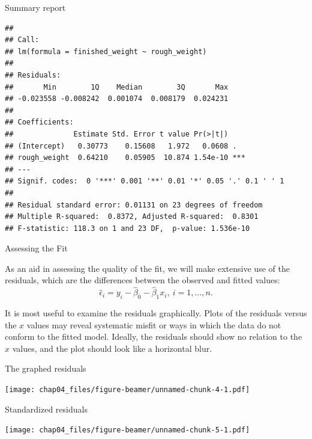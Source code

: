 \documentclass[ignorenonframetext,]{beamer}
\begin{document}
\begin{frame}[fragile]{Summary report}
\protect\hypertarget{summary-report}{}

\begin{verbatim}
## 
## Call:
## lm(formula = finished_weight ~ rough_weight)
## 
## Residuals:
##       Min        1Q    Median        3Q       Max 
## -0.023558 -0.008242  0.001074  0.008179  0.024231 
## 
## Coefficients:
##              Estimate Std. Error t value Pr(>|t|)    
## (Intercept)   0.30773    0.15608   1.972   0.0608 .  
## rough_weight  0.64210    0.05905  10.874 1.54e-10 ***
## ---
## Signif. codes:  0 '***' 0.001 '**' 0.01 '*' 0.05 '.' 0.1 ' ' 1
## 
## Residual standard error: 0.01131 on 23 degrees of freedom
## Multiple R-squared:  0.8372, Adjusted R-squared:  0.8301 
## F-statistic: 118.3 on 1 and 23 DF,  p-value: 1.536e-10
\end{verbatim}

\end{frame}

\begin{frame}{Assessing the Fit}
\protect\hypertarget{assessing-the-fit}{}

As an aid in assessing the quality of the fit, we will make extensive
use of the residuals, which are the differences between the observed and
fitted values:
\[\hat \epsilon_i = y_i-\hat\beta_0-\hat\beta_1x_i,\ i=1,\dots,n.\]

It is most useful to examine the residuals graphically. Plots of the
residuals versus the \(x\) values may reveal systematic misfit or ways
in which the data do not conform to the fitted model. Ideally, the
residuals should show no relation to the \(x\) values, and the plot
should look like a horizontal blur.

\end{frame}

\begin{frame}{The graphed residuals}
\protect\hypertarget{the-graphed-residuals}{}

\texttt{[image: chap04\_files/figure-beamer/unnamed-chunk-4-1.pdf]}

\end{frame}

\begin{frame}{Standardized residuals}
\protect\hypertarget{standardized-residuals}{}

\texttt{[image: chap04\_files/figure-beamer/unnamed-chunk-5-1.pdf]}

\end{frame}
\end{document}
